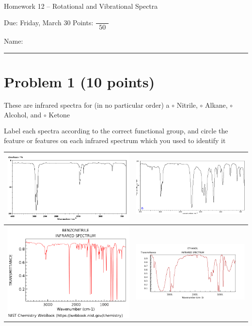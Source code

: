 \documentclass[10pt, letterpaper]{memoir}
\begin{document}
\begin{center}
	{\large Homework 12 -- Rotational and Vibrational Spectra}
	
	Due: Friday, March 30 \hspace{3em} Points: ${\dfrac{~}{~~50~~}}$
\end{center}

Name: \rule[-.1mm]{15em}{0.1pt}	
	
	\section*{Problem 1 (10 points)}
	These are infrared spectra for (in no particular order) a $\circ$ Nitrile, $\circ$ Alkane, $\circ$ Alcohol, and $\circ$ Ketone
	
	\noindent
	Label each spectra according to the correct functional group, and circle the feature or features on each infrared spectrum which you used to identify it
	
	\noindent
	\begin{tabular}{c|c}
		\includegraphics[width=0.49\linewidth]{Alkane} & \includegraphics[width=0.49\linewidth]{Ketone} \\ \midrule
		\includegraphics[width=0.49\linewidth, trim = 0 0 0 40, clip]{Nitrile} & \includegraphics[width=0.49\linewidth, trim = 25 0 40 32, clip]{Alcohol}
	\end{tabular}
	
\end{document}
